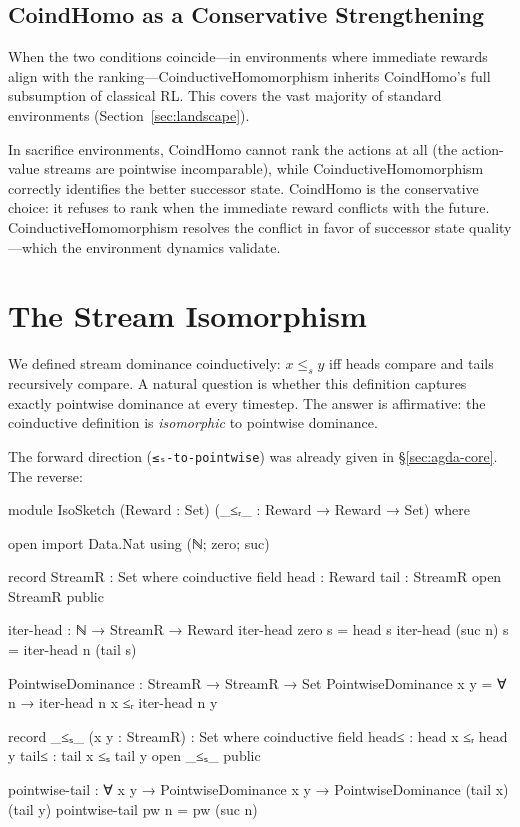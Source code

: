 \documentclass[9pt,a4paper]{article}
\theoremstyle{plain}
\theoremstyle{definition}
\theoremstyle{remark}
\begin{document}
\subsection{CoindHomo as a Conservative Strengthening}

When the two conditions coincide---in environments where immediate rewards align with the ranking---CoinductiveHomomorphism inherits CoindHomo's full subsumption of classical RL.  This covers the vast majority of standard environments (Section~\ref{sec:landscape}).

In sacrifice environments, CoindHomo cannot rank the actions at all (the action-value streams are pointwise incomparable), while CoinductiveHomomorphism correctly identifies the better successor state.  CoindHomo is the conservative choice: it refuses to rank when the immediate reward conflicts with the future.  CoinductiveHomomorphism resolves the conflict in favor of successor state quality---which the environment dynamics validate.


\section{The Stream Isomorphism}\label{sec:stream-iso}

We defined stream dominance coinductively: $x \le_s y$ iff heads compare and tails recursively compare.  A natural question is whether this definition captures exactly pointwise dominance at every timestep.  The answer is affirmative: the coinductive definition is \emph{isomorphic} to pointwise dominance.

The forward direction (\texttt{≤ₛ-to-pointwise}) was already given in \S\ref{sec:agda-core}.  The reverse:

\begin{code}[hide]
module IsoSketch
  (Reward : Set)
  (_≤ᵣ_ : Reward → Reward → Set)
  where
  
  open import Data.Nat using (ℕ; zero; suc)
  
  record StreamR : Set where
    coinductive
    field head : Reward
          tail : StreamR
  open StreamR public
  
  iter-head : ℕ → StreamR → Reward
  iter-head zero s = head s
  iter-head (suc n) s = iter-head n (tail s)
  
  PointwiseDominance : StreamR → StreamR → Set
  PointwiseDominance x y = ∀ n → iter-head n x ≤ᵣ iter-head n y

  record _≤ₛ_ (x y : StreamR) : Set where
    coinductive
    field head≤ : head x ≤ᵣ head y
          tail≤ : tail x ≤ₛ tail y
  open _≤ₛ_ public
  
  pointwise-tail : ∀ {x y} → PointwiseDominance x y → PointwiseDominance (tail x) (tail y)
  pointwise-tail pw n = pw (suc n)
\end{code}
\end{document}
